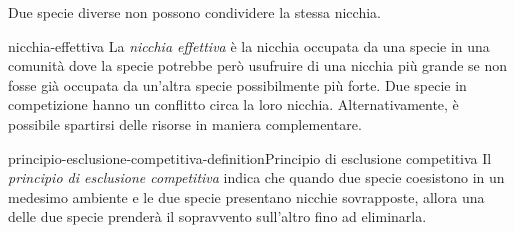 \documentclass[preview]{standalone}
\begin{document}
\begin{plainhtml}
    Due specie diverse non possono condividere la stessa nicchia.
\end{plainhtml}

\begin{snippet}{nicchia-effettiva}
    La \textit{nicchia effettiva} è la nicchia occupata da una specie in una comunità
    dove la specie potrebbe però usufruire di una nicchia più grande se
    non fosse già occupata da un'altra specie possibilmente più forte.
    Due specie in competizione hanno un conflitto circa la loro nicchia.
    Alternativamente, è possibile spartirsi delle risorse in maniera complementare.
\end{snippet}

\begin{snippetdefinition}{principio-esclusione-competitiva-definition}{Principio di esclusione competitiva}
    Il \textit{principio di esclusione competitiva} indica che quando due specie coesistono in un medesimo ambiente e le due specie
    presentano nicchie sovrapposte, allora una delle due specie prenderà il sopravvento sull'altro
    fino ad eliminarla.
\end{snippetdefinition}

\end{document}

